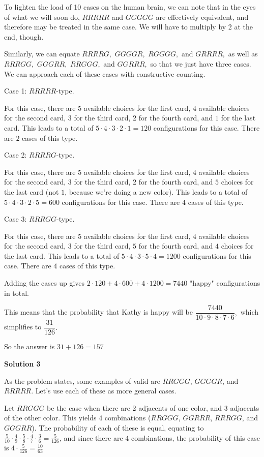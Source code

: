 \begin{enumerate}
 To lighten the load of 10 cases on the human brain, we can note that in the eyes of what we will soon do, $RRRRR$ and $GGGGG$ are effectively equivalent, and therefore may be treated in the same case. We will have to multiply by 2 at the end, though.

 Similarly, we can equate $RRRRG,$ $GGGGR,$ $RGGGG,$ and $GRRRR,$ as well as $RRRGG,$ $GGGRR,$ $RRGGG,$ and $GGRRR,$ so that we just have three cases. We can approach each of these cases with constructive counting.

 Case 1: $RRRRR$-type.

 For this case, there are $5$ available choices for the first card, $4$ available choices for the second card, $3$ for the third card, $2$ for the fourth card, and $1$ for the last card. This leads to a total of $5\cdot 4\cdot 3\cdot 2\cdot 1=120$ configurations for this case. There are $2$ cases of this type.

 Case 2: $RRRRG$-type.

 For this case, there are $5$ available choices for the first card, $4$ available choices for the second card, $3$ for the third card, $2$ for the fourth card, and $5$ choices for the last card (not $1$, because we're doing a new color). This leads to a total of $5\cdot 4\cdot 3\cdot 2\cdot 5=600$ configurations for this case. There are $4$ cases of this type.

 Case 3: $RRRGG$-type.

 For this case, there are $5$ available choices for the first card, $4$ available choices for the second card, $3$ for the third card, $5$ for the fourth card, and $4$ choices for the last card. This leads to a total of $5\cdot 4\cdot 3\cdot 5\cdot 4=1200$ configurations for this case. There are $4$ cases of this type.

 Adding the cases up gives $2\cdot 120+4\cdot 600+4\cdot 1200=7440$ "happy" configurations in total.

 This means that the probability that Kathy is happy will be $\dfrac{7440}{10\cdot 9\cdot 8\cdot 7\cdot 6},$ which simplifies to $\dfrac{31}{126}.$

 So the answer is $31+126=\boxed{157}$




\textbf{Solution 3}

As the problem states, some examples of valid are $RRGGG$, $GGGGR$, and $RRRRR$. Let's use each of these as more general cases. 

 Let $RRGGG$ be the case when there are 2 adjacents of one color, and 3 adjacents of the other color. This yields $4$ combinations ($RRGGG$, $GGRRR$, $RRRGG$, and $GGGRR$). The probability of each of these is equal, equating to $\frac{5}{10}\cdot \frac{4}{9}\cdot \frac{5}{8}\cdot \frac{4}{7}\cdot \frac{3}{6}=\frac{5}{126}$, and since there are $4$ combinations, the probability of this case is $4\cdot \frac{5}{126}=\frac{10}{63}$


\end{enumerate}
